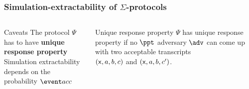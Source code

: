 \documentclass[aspectratio=169,handout]{beamer}
\renewcommand{\emph}[1]{\textbf{#1}}
\begin{document}
\begin{frame}
  \frametitle{Simulation-extractability of $\Sigma$-protocols}
  \begin{center}{}
\end{center}
\begin{columns}
  \begin{column}{.4\linewidth}
  \begin{block}{Caveats}
    The protocol $\Psi$ has to have \emph{unique response property}\\
    Simulation extractability depends on the probability $\accProb$
  \end{block}
\end{column}
\begin{column}{.4\linewidth}
  \begin{block}{Unique response property}
    $\Psi$ has unique response property if no $\ppt$ adversary $\adv$ can come
    up with two acceptable transcripts\\
    $(\mathsf{x}, a, b, c)$ and $(\mathsf{x}, a, b, c')$.
  \end{block}
\end{column}
\end{columns}
\end{frame}
\end{document}

